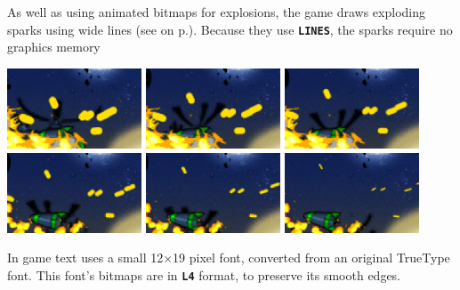 \documentclass[10pt]{book}
\newcommand{\mach}[1]{\texttt{\textbf{#1}}}
\newcommand{\xref}[1]{\textit{\nameref{#1}} on  p.\pageref{#1}}
\begin{document}
As well as using animated bitmaps for explosions,
the game draws exploding sparks using wide lines (see \xref{lines}).
Because they use \mach{LINES}, the sparks require no graphics memory
\begin{center}
\includegraphics[width=0.3\textwidth]{ns-lines-0006.png}
\includegraphics[width=0.3\textwidth]{ns-lines-0007.png}
\includegraphics[width=0.3\textwidth]{ns-lines-0008.png}
\includegraphics[width=0.3\textwidth]{ns-lines-0009.png}
\includegraphics[width=0.3\textwidth]{ns-lines-0010.png}
\includegraphics[width=0.3\textwidth]{ns-lines-0011.png}
\end{center}

\noindent
In game text uses a small 12$\times$19 pixel font, converted from an
original TrueType font.
This font's bitmaps are in \mach{L4} format, to preserve its smooth edges.
\end{document}
